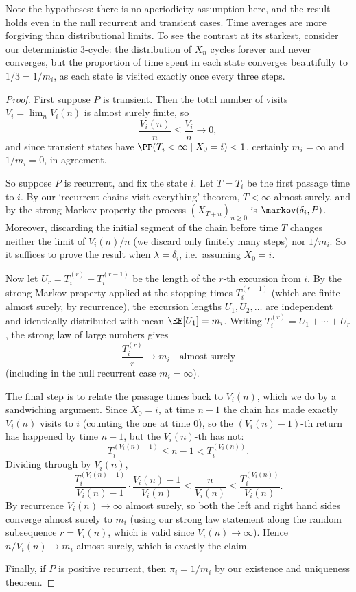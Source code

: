 Note the hypotheses: there is no aperiodicity assumption here, and the result holds even in the null recurrent and transient cases. Time averages are more forgiving than distributional limits. To see the contrast at its starkest, consider our deterministic 3-cycle: the distribution of $X_n$ cycles forever and never converges, but the proportion of time spent in each state converges beautifully to $1/3 = 1/m_i$, as each state is visited exactly once every three steps.

\begin{proof}
	First suppose $P$ is transient. Then the total number of visits $V_i = \lim_n V_i(n)$ is almost surely finite, so
	$$
	\frac{V_i(n)}{n} \leq \frac{V_i}{n} \rightarrow 0,
	$$
	and since transient states have $\PP(T_i < \infty \mid X_0 = i) < 1$, certainly $m_i = \infty$ and $1/m_i = 0$, in agreement.

	So suppose $P$ is recurrent, and fix the state $i$. Let $T = T_i$ be the first passage time to $i$. By our `recurrent chains visit everything' theorem, $T < \infty$ almost surely, and by the strong Markov property the process $(X_{T + n})_{n \geq 0}$ is $\markov(\delta_i, P)$. Moreover, discarding the initial segment of the chain before time $T$ changes neither the limit of $V_i(n)/n$ (we discard only finitely many steps) nor $1/m_i$. So it suffices to prove the result when $\lambda = \delta_i$, i.e.\ assuming $X_0 = i$.

	Now let $U_r = T_i^{(r)} - T_i^{(r - 1)}$ be the length of the $r$-th excursion from $i$. By the strong Markov property applied at the stopping times $T_i^{(r - 1)}$ (which are finite almost surely, by recurrence), the excursion lengths $U_1, U_2, \dots$ are independent and identically distributed with mean $\EE[U_1] = m_i$. Writing $T_i^{(r)} = U_1 + \cdots + U_r$, the strong law of large numbers gives
	$$
	\frac{T_i^{(r)}}{r} \rightarrow m_i \quad \text{almost surely}
	$$
	(including in the null recurrent case $m_i = \infty$).

	The final step is to relate the passage times back to $V_i(n)$, which we do by a sandwiching argument. Since $X_0 = i$, at time $n - 1$ the chain has made exactly $V_i(n)$ visits to $i$ (counting the one at time 0), so the $(V_i(n) - 1)$-th return has happened by time $n - 1$, but the $V_i(n)$-th has not:
	$$
	T_i^{(V_i(n) - 1)} \leq n - 1 < T_i^{(V_i(n))}.
	$$
	Dividing through by $V_i(n)$,
	$$
	\frac{T_i^{(V_i(n) - 1)}}{V_i(n) - 1} \cdot \frac{V_i(n) - 1}{V_i(n)} \leq \frac{n}{V_i(n)} \leq \frac{T_i^{(V_i(n))}}{V_i(n)}.
	$$
	By recurrence $V_i(n) \rightarrow \infty$ almost surely, so both the left and right hand sides converge almost surely to $m_i$ (using our strong law statement along the random subsequence $r = V_i(n)$, which is valid since $V_i(n) \rightarrow \infty$). Hence $n / V_i(n) \rightarrow m_i$ almost surely, which is exactly the claim.

	Finally, if $P$ is positive recurrent, then $\pi_i = 1/m_i$ by our existence and uniqueness theorem.
\end{proof}

